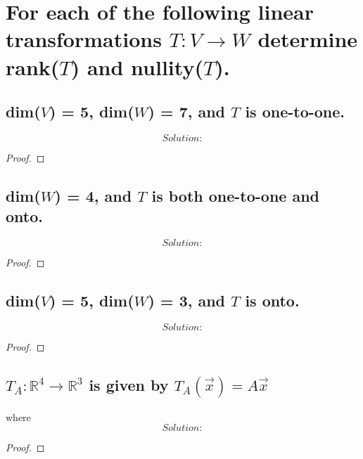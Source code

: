 \documentclass[../main.tex]{subfiles}
\begin{document}
\section[Problem 1]{For each of the following linear transformations $T: V \to W$ determine rank($T$) and nullity($T$).}

\subsection{dim($V$) = 5, dim($W$) = 7, and $T$ is one-to-one.}
\begin{equation*}
        \boxed{ Solution:}
\end{equation*}
\begin{proof}
\end{proof}
\pagebreak

\subsection{dim($W$) = 4, and $T$ is both one-to-one and onto.}
\begin{equation*}
        \boxed{ Solution:}
\end{equation*}
\begin{proof}
\end{proof}

\subsection{dim($V$) = 5, dim($W$) = 3, and $T$ is onto.}
\begin{equation*}
        \boxed{ Solution:}
\end{equation*}
\begin{proof}
\end{proof}

\subsection{$T_A: \mathbb{R}^4 \to \mathbb{R}^3$ is given by $T_A(\vec{x}) = A\vec{x}$ }
where 
\begin{equation*}
        \boxed{ Solution:}
\end{equation*}
\begin{proof}
\end{proof}
\end{document}
